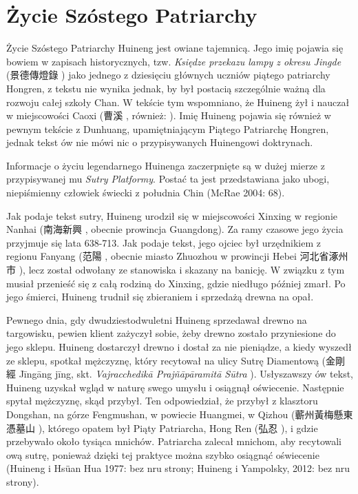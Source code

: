 \section{Życie Szóstego Patriarchy}
Życie Szóstego Patriarchy Huineng jest owiane tajemnicą. Jego imię pojawia się bowiem w zapisach historycznych, tzw. \textit{Księdze przekazu lampy z okresu Jingde} (景德傳燈錄 ) jako jednego z dziesięciu głównych uczniów piątego patriarchy Hongren, z tekstu nie wynika jednak, by był postacią szczególnie ważną dla rozwoju całej szkoły Chan. W tekście tym wspomniano, że Huineng żył i nauczał w miejscowości Caoxi (曹溪 , również: ). Imię Huineng pojawia się również w pewnym tekście z Dunhuang, upamiętniającym Piątego Patriarchę Hongren, jednak tekst ów nie mówi nic o przypisywanych Huinengowi doktrynach.

Informacje o życiu legendarnego Huinenga zaczerpnięte są w dużej mierze z przypisywanej mu \textit{Sutry Platformy}. Postać ta jest przedstawiana jako ubogi, niepiśmienny człowiek świecki z południa Chin (McRae 2004: 68).

Jak podaje tekst sutry, Huineng urodził się w miejscowości Xinxing w regionie Nanhai (南海新興 , obecnie prowincja Guangdong). Za ramy czasowe jego życia przyjmuje się lata 638-713.
Jak podaje tekst, jego ojciec był urzędnikiem z regionu Fanyang (范陽 , obecnie miasto Zhuozhou w prowincji Hebei 河北省涿州市 ), lecz został odwołany ze stanowiska i skazany na banicję. W związku z tym musiał przenieść się z całą rodziną do Xinxing, gdzie niedługo później zmarł. Po jego śmierci, Huineng trudnił się zbieraniem i sprzedażą drewna na opał.

Pewnego dnia, gdy dwudziestodwuletni Huineng sprzedawał drewno na targowisku, pewien klient zażyczył sobie, żeby drewno zostało przyniesione do jego sklepu. Huineng dostarczył drewno i dostał za nie pieniądze, a kiedy wyszedł ze sklepu, spotkał mężczyznę, który recytował na ulicy Sutrę Diamentową (金剛經 Jīngāng jīng, skt. \textit{Vajracchedikā Prajñāpāramitā Sūtra}
). Usłyszawszy ów tekst, Huineng uzyskał wgląd w naturę swego umysłu i osiągnął oświecenie. Następnie spytał mężczyznę, skąd przybył. Ten odpowiedział, że przybył z klasztoru Dongshan, na górze Fengmushan, w powiecie Huangmei, w Qizhou (蘄州黃梅懸東憑墓山
), którego opatem był Piąty Patriarcha, Hong Ren (弘忍 ), i gdzie przebywało około tysiąca mnichów. Patriarcha zalecał mnichom, aby recytowali ową sutrę, ponieważ dzięki tej praktyce można szybko osiągnąć oświecenie (Huineng i Hsüan Hua 1977: bez nru strony; Huineng i Yampolsky, 2012: bez nru strony).

